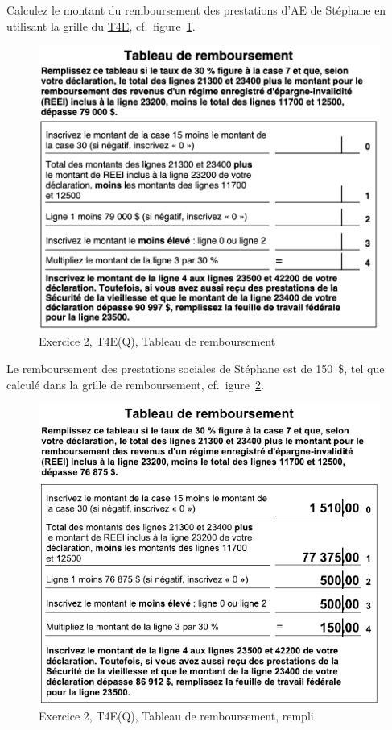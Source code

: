 \begin{sousQuestion}
	Calculez le montant du remboursement des prestations d'AE de Stéphane en utilisant la grille du \href{https://www.canada.ca/fr/agence-revenu/services/formulaires-publications/formulaires/t4e.html}{T4E}, cf.~figure~\ref{fig:chap7Exercice2T4E}.
	\begin{figure}
		\centering
		\includegraphics[width=.9\textwidth]{exercice/7-2/Q4/T4E.png}
		\caption[]{Exercice 2, T4E(Q), Tableau de remboursement}
		\label{fig:chap7Exercice2T4E}
	\end{figure}
\end{sousQuestion}
Le remboursement des prestations sociales de Stéphane est de 150~\$, tel que calculé dans la grille de remboursement, cf.~igure~\ref{fig:chap7Exercice2T4ERep}.
\begin{figure}
	\centering
	\includegraphics[width=.9\textwidth]{exercice/7-2/Q4/T4EReponse.png}
	\caption[]{Exercice 2, T4E(Q), Tableau de remboursement, rempli}
	\label{fig:chap7Exercice2T4ERep}
\end{figure}
